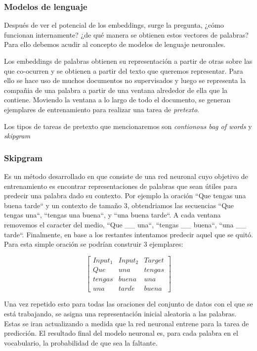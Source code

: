 \subsubsection{Modelos de lenguaje}

Después de ver el potencial de los embeddings, surge la pregunta, ¿cómo
funcionan internamente? ¿de qué manera se obtienen estos vectores de palabras?
Para ello debemos acudir al concepto de modelos de lenguaje neuronales.

Los embeddings de palabras obtienen su representación a partir de otras sobre
las que co-ocurren \citep{} y se obtienen a partir del texto que queremos
representar. Para ello se hace uso de muchos documentos no supervisados y luego
se representa la compañia de una palabra a partir de una ventana alrededor de
ella que la contiene. Moviendo la ventana a lo largo de todo el documento, se
generan ejemplares de entrenamiento para realizar una tarea de \emph{pretexto}.

Los tipos de tareas de pretexto que mencionaremos son \emph{contionous bag of words} y \emph{skipgram}

\subsubsection{Skipgram}

Es un método desarrollado en \citep{Mikolov-2013} que consiste de una red
neuronal cuyo objetivo de entrenamiento es encontrar representaciones de
palabras que sean útiles para predecir una palabra dado su contexto. Por ejemplo
la oración ``Que tengas una buena tarde`` y un contexto de tamaño 3,
obtendriamos las secuencias ``Que tengas una``, ``tengas una buena``, y ``una
buena tarde``. A cada ventana removemos el caracter del medio, ``Que \_\_ una``,
``tengas \_\_ buena``, ``una \_\_ tarde``. Finalmente, en base a los restantes
intentamos predecir aquel que se quitó. Para esta simple oración se podrían
construir 3 ejemplares:

\begin{equation*}
    \begin{bmatrix}
        Input_1 & Input_2 & Target\\
        Que & una & tengas  \\
        tengas & buena & una \\
        una & tarde & buena
    \end{bmatrix}
\end{equation*}

Una vez repetido esto para todas las oraciones del conjunto de datos con el
que se está trabajando, se asigna una representación inicial aleatoria
a las palabras. Estas se iran actualizando a medida que la red neuronal
entrene para la tarea de predicción. El resultado final del modelo neuronal
es, para cada palabra en el vocabulario, la probabilidad de que sea la faltante.

